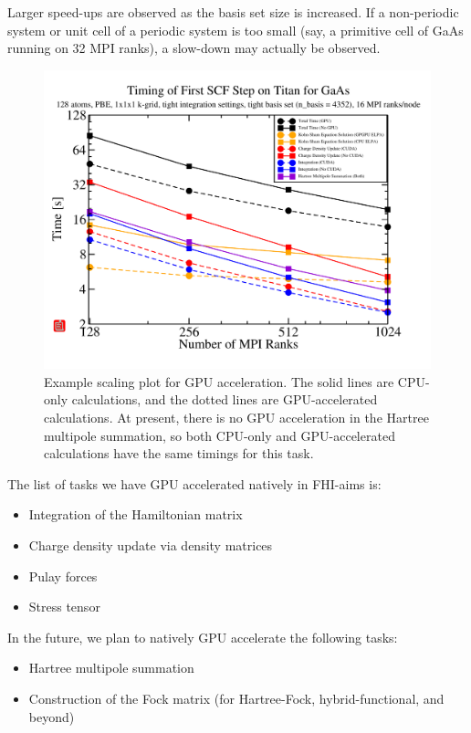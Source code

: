 Larger speed-ups are observed as the basis set size is increased. If a non-periodic system or unit cell of a periodic system is too small (say, a primitive cell of GaAs running on 32 MPI ranks), a slow-down may actually be observed.

\begin{figure}
\includegraphics[width=\linewidth]{GaAs_4x4x4Supercell_NoPrecond_GPUBatchSize200}
\caption{Example scaling plot for GPU acceleration. The solid lines are CPU-only calculations, and the dotted lines are GPU-accelerated calculations. At present, there is no GPU acceleration in the Hartree multipole summation, so both CPU-only and GPU-accelerated calculations have the same timings for this task.}
\label{fig:GPU_Scaling}
\end{figure}

The list of tasks we have GPU accelerated natively in FHI-aims is:
\begin{itemize}
\item Integration of the Hamiltonian matrix
\item Charge density update via density matrices
\item Pulay forces
\item Stress tensor
\end{itemize}

In the future, we plan to natively GPU accelerate the following tasks:
\begin{itemize}
\item Hartree multipole summation
\item Construction of the Fock matrix (for Hartree-Fock, hybrid-functional, and beyond)
\end{itemize}

